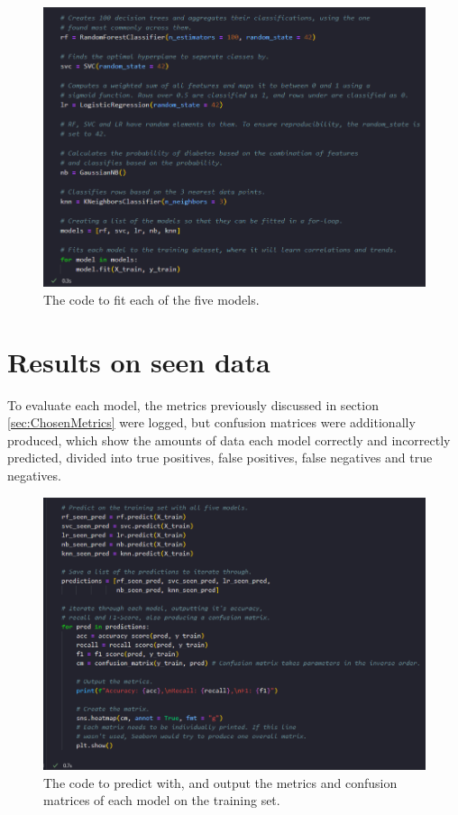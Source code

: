 \documentclass[12pt]{report}
\begin{document}
\begin{figure}[H]
    \centering 
    \includegraphics[width=\linewidth]{ModelDev/Iteration1/Code/Fitting.png}
    \caption{The code to fit each of the five models.}
    \label{fig:ModelFitting}
\end{figure}


\pagebreak
\section{Results on seen data}

To evaluate each model, the metrics previously discussed in section \ref{sec:ChosenMetrics} 
were logged, but confusion matrices were additionally produced, which show the amounts of data
each model correctly and incorrectly predicted, divided into true positives, false positives, 
false negatives and true negatives.

\begin{figure}[H]
    \centering 
    \includegraphics[width=\linewidth]{ModelDev/Iteration1/Code/Seen/Matrices.png}
    \caption{The code to predict with, and output the metrics and confusion matrices of each model on the training set.}
    \label{fig:SeenDataCode}
\end{figure}
\end{document}

